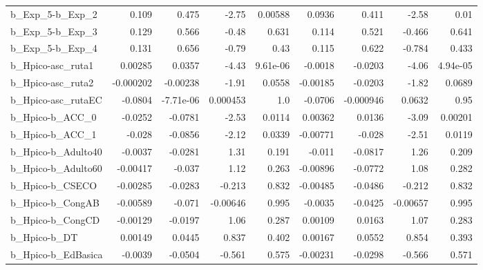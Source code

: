 \begin{tabular}{lrrrrrrrr}
b\_Exp\_5-b\_Exp\_2            &       0.109 &        0.475 &     -2.75 &  0.00588 &     0.0936 &       0.411 &        -2.58 &          0.01 \\
b\_Exp\_5-b\_Exp\_3            &       0.129 &        0.566 &     -0.48 &    0.631 &      0.114 &       0.521 &       -0.466 &         0.641 \\
b\_Exp\_5-b\_Exp\_4            &       0.131 &        0.656 &     -0.79 &     0.43 &      0.115 &       0.622 &       -0.784 &         0.433 \\
b\_Hpico-asc\_ruta1          &     0.00285 &       0.0357 &     -4.43 & 9.61e-06 &    -0.0018 &     -0.0203 &        -4.06 &      4.94e-05 \\
b\_Hpico-asc\_ruta2          &   -0.000202 &     -0.00238 &     -1.91 &   0.0558 &   -0.00185 &     -0.0203 &        -1.82 &        0.0689 \\
b\_Hpico-asc\_rutaEC         &     -0.0804 &    -7.71e-06 &  0.000453 &      1.0 &    -0.0706 &   -0.000946 &       0.0632 &          0.95 \\
b\_Hpico-b\_ACC\_0            &     -0.0252 &      -0.0781 &     -2.53 &   0.0114 &    0.00362 &      0.0136 &        -3.09 &       0.00201 \\
b\_Hpico-b\_ACC\_1            &      -0.028 &      -0.0856 &     -2.12 &   0.0339 &   -0.00771 &      -0.028 &        -2.51 &        0.0119 \\
b\_Hpico-b\_Adulto40         &     -0.0037 &      -0.0281 &      1.31 &    0.191 &     -0.011 &     -0.0817 &         1.26 &         0.209 \\
b\_Hpico-b\_Adulto60         &    -0.00417 &       -0.037 &      1.12 &    0.263 &   -0.00896 &     -0.0772 &         1.08 &         0.282 \\
b\_Hpico-b\_CSECO            &    -0.00285 &      -0.0283 &    -0.213 &    0.832 &   -0.00485 &     -0.0486 &       -0.212 &         0.832 \\
b\_Hpico-b\_CongAB           &    -0.00589 &       -0.071 &  -0.00646 &    0.995 &    -0.0035 &     -0.0425 &     -0.00657 &         0.995 \\
b\_Hpico-b\_CongCD           &    -0.00129 &      -0.0197 &      1.06 &    0.287 &    0.00109 &      0.0163 &         1.07 &         0.283 \\
b\_Hpico-b\_DT               &     0.00149 &       0.0445 &     0.837 &    0.402 &    0.00167 &      0.0552 &        0.854 &         0.393 \\
b\_Hpico-b\_EdBasica         &     -0.0039 &      -0.0504 &    -0.561 &    0.575 &   -0.00231 &     -0.0298 &       -0.566 &         0.571 \\

\end{tabular}
